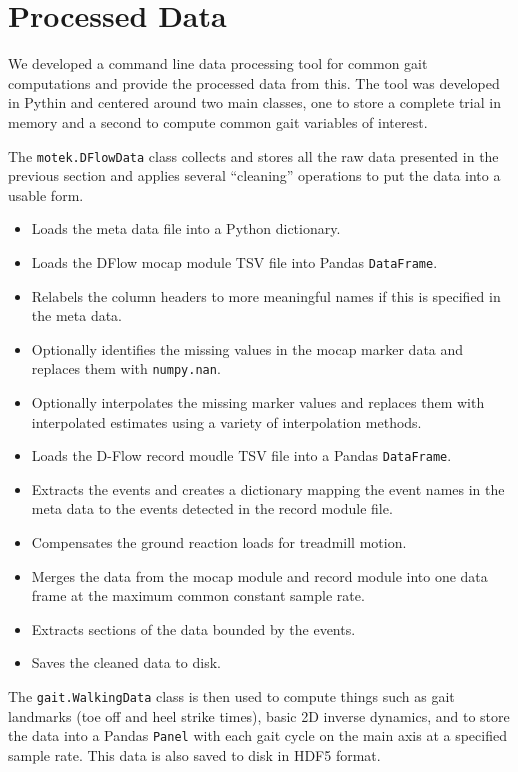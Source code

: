 \documentclass{article}
\begin{document}
\section{Processed Data}

We developed a command line data processing tool for common gait computations
and provide the processed data from this. The tool was developed in Pythin and centered around two main
classes, one to store a complete trial in memory and a second to compute common
gait variables of interest.

The \verb|motek.DFlowData| class collects and stores all the raw data presented
in the previous section and applies several ``cleaning'' operations to put the
data into a usable form.

\begin{itemize}
  \item Loads the meta data file into a Python dictionary.
  \item Loads the DFlow mocap module TSV file into Pandas \verb|DataFrame|.
  \item Relabels the column headers to more meaningful names if this is
    specified in the meta data.
  \item Optionally identifies the missing values in the mocap marker data and
    replaces them with \verb|numpy.nan|.
  \item Optionally interpolates the missing marker values and replaces them
    with interpolated estimates using a variety of interpolation methods.
  \item Loads the D-Flow record moudle TSV file into a Pandas \verb|DataFrame|.
  \item Extracts the events and creates a dictionary mapping the event names in
    the meta data to the events detected in the record module file.
  \item Compensates the ground reaction loads for treadmill motion.
  \item Merges the data from the mocap module and record module into one data
    frame at the maximum common constant sample rate.
  \item Extracts sections of the data bounded by the events.
  \item Saves the cleaned data to disk.
\end{itemize}

The \verb|gait.WalkingData| class is then used to compute things such as gait
landmarks (toe off and heel strike times), basic 2D inverse dynamics, and to
store the data into a Pandas \verb|Panel| with each gait cycle on the main axis
at a specified sample rate. This data is also saved to disk in HDF5 format.
\end{document}
